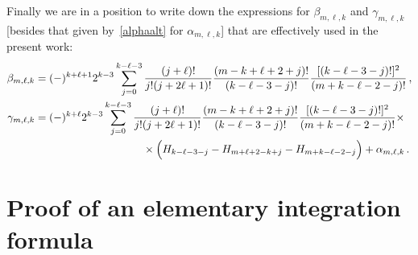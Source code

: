 \documentclass[prd,preprint,superscriptaddress,tightenlines,nofootinbib,
  eqsecnum,showpacs]{revtex4}
\begin{document}
Finally we are in a position to write down the expressions for
$\beta_{m,\ell,k}$ and $\gamma_{m,\ell,k}$ [besides that given
  by~\eqref{alphaalt} for $\alpha_{m,\ell,k}$] that are effectively
used in the present work:
%
\begin{subequations}\label{betagammaused}
\begin{align}
\beta_{m,\ell,k} &= (-)^{k + \ell +1} 2^{k-3} \sum_{j=0}^{k-\ell-3}
\frac{(j+\ell)!}{j!(j+2\ell +1)!}  \frac{(m-k+\ell+2 + j)!}{(k-\ell -3
  -j)!}  \frac{[(k-\ell-3-j)!]^2}{(m+k-\ell-2-j)!} \,
,\\ \gamma_{m,\ell,k} &= (-)^{k + \ell} 2^{k-3} \sum_{j=0}^{k-\ell-3}
\frac{(j+\ell)!}{j!(j+2\ell +1)!}  \frac{(m-k+\ell+2 + j)!}{(k-\ell -3
  -j)!}  \frac{[(k-\ell-3-j)!]^2}{(m+k-\ell-2-j)!} \times \nonumber
\\ & \qquad \qquad \qquad \qquad \qquad \times \Bigl(H_{k-\ell-3-j} -
H_{m+\ell + 2 -k + j} - H_{m+k-\ell -2 -j}\Bigr) + \alpha_{m,\ell,k}
\,.\label{gammaused}
\end{align}
\end{subequations}
%

\section{Proof of an elementary integration formula}
\label{app:proof_formula}
\end{document}
